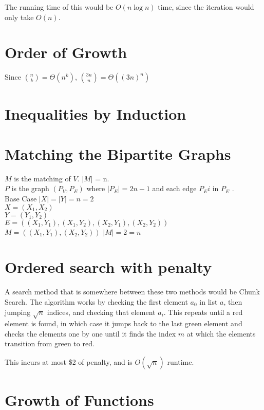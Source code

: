\documentclass[14pt, letterpaper]{article}
\begin{document}
The running time of this would be $O(n \log n)$ time, since the iteration would
only take $O(n)$.

\section{Order of Growth}
Since $\displaystyle {n \choose k} = \Theta(n^k)$, $\displaystyle {3n \choose n} = \Theta((3n)^n)$

\section{Inequalities by Induction}

\section{Matching the Bipartite Graphs}
$M$ is the matching of $V$. $|M|$ = n. \\
$P$ is the graph $(P_V, P_E)$ where $|P_E| = 2n - 1$ and each edge $P_Ei$ in 
$P_E$ . \\

Base Case
$|X| = |Y| = n = 2$ \\
$X = (X_1, X_2)$ \\
$Y = (Y_1, Y_2)$ \\
$E = ((X_1, Y_1), (X_1, Y_2), (X_2, Y_1), (X_2, Y_2))$
$M = ((X_1, Y_1), (X_2, Y_2))$
$|M| = 2 = n$
\begin{equation}
	
\end{equation}

\section{Ordered search with penalty}
A search method that is somewhere between these two methods would be Chunk
Search. The algorithm works by checking the first element $a_0$ in list $a$,
then jumping $\sqrt n$ indices, and checking that element $a_i$. This
repeats until a red element is found, in which case it jumps back to the last
green element and checks the elements one by one until it finds the index $m$
at which the elements transition from green to red.

This incurs at most \$2 of penalty, and is $O(\sqrt n)$ runtime.

\section{Growth of Functions}
\end{document}

